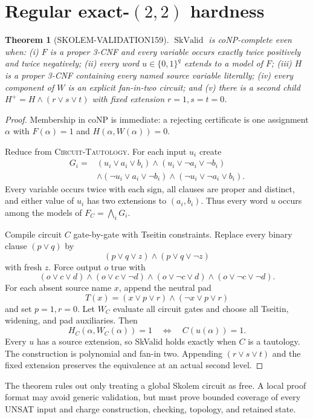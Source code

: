 \documentclass[11pt]{article}
\newtheorem{theorem}{Theorem}
\begin{document}
\section*{Regular exact-$(2,2)$ hardness}
\begin{theorem}[SKOLEM-VALIDATION159]
$\operatorname{SkValid}$ is coNP-complete even when: (i) $F$ is a proper
3-CNF and every variable occurs exactly twice positively and twice negatively;
(ii) every word $u\in\{0,1\}^q$ extends to a model of $F$; (iii) $H$ is a
proper 3-CNF containing every named source variable literally; (iv) every
component of $W$ is an explicit fan-in-two circuit; and (v) there is a second
child $H^+=H\wedge(r\vee s\vee t)$ with fixed extension $r=1,s=t=0$.
\end{theorem}

\begin{proof}
Membership in coNP is immediate: a rejecting certificate is one assignment
$\alpha$ with $F(\alpha)=1$ and $H(\alpha,W(\alpha))=0$.

Reduce from \textsc{Circuit-Tautology}.  For each input $u_i$ create
\[
\begin{split}
G_i={}&(u_i\vee a_i\vee b_i)\wedge
(u_i\vee\neg a_i\vee\neg b_i)\\
&\wedge(\neg u_i\vee a_i\vee\neg b_i)\wedge
(\neg u_i\vee\neg a_i\vee b_i).
\end{split}
\]
Every variable occurs twice with each sign, all clauses are proper and
distinct, and either value of $u_i$ has two extensions to $(a_i,b_i)$.
Thus every word $u$ occurs among the models of $F_C=\bigwedge_iG_i$.

Compile circuit $C$ gate-by-gate with Tseitin constraints.  Replace every
binary clause $(p\vee q)$ by
\[(p\vee q\vee z)\wedge(p\vee q\vee\neg z)\]
with fresh $z$.  Force output $o$ true with
\[
(o\vee c\vee d)\wedge(o\vee c\vee\neg d)\wedge
(o\vee\neg c\vee d)\wedge(o\vee\neg c\vee\neg d).
\]
For each absent source name $x$, append the neutral pad
\[T(x)=(x\vee p\vee r)\wedge(\neg x\vee p\vee r)\]
and set $p=1,r=0$.  Let $W_C$ evaluate all circuit gates and choose all
Tseitin, widening, and pad auxiliaries.  Then
\[H_C(\alpha,W_C(\alpha))=1\quad\Longleftrightarrow\quad C(u(\alpha))=1.
\]
Every $u$ has a source extension, so SkValid holds exactly when $C$ is a
tautology.  The construction is polynomial and fan-in two.  Appending
$(r\vee s\vee t)$ and the fixed extension preserves the equivalence at an
actual second level.
\end{proof}

The theorem rules out only treating a global Skolem circuit as free.  A local
proof format may avoid generic validation, but must prove bounded coverage of
every UNSAT input and charge construction, checking, topology, and retained
state.
\end{document}
